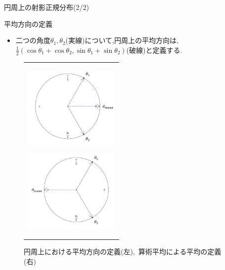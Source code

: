 \documentclass[dvipdfmx]{beamer} %
\begin{document}
\begin{frame}{円周上の射影正規分布(2/2)}

\begin{itembox}[l]{平均方向の定義}
\begin{itemize}

	\item 
	二つの角度$\theta_1, \theta_2$(実線)について,円周上の平均方向は, $\frac{1}{2} (\cos \theta_1 + \cos \theta_2,\sin \theta_1 + \sin \theta_2)$(破線)と定義する.
\end{itemize}
\end{itembox}

\vspace{-0.1cm}
\begin{figure}[H]
 \begin{tabular}{c}
 \begin{minipage}{0.5\hsize}
  \begin{center}
   \includegraphics[clip,height= 40mm]{data/sample_True_1.png}
\label{sample_mu1}
  \end{center}
 \end{minipage}
 \hspace{-0.8cm}
 \begin{minipage}{0.5\hsize}
  \begin{center}
 \includegraphics[clip,height= 40mm]{data/sample_False_1.png}
\label{sample_mu2}
  \end{center}
 \end{minipage}
\end{tabular}
\label{sample_mu}
\vspace{-0.1cm}
\caption{円周上における平均方向の定義(左),\ 算術平均による平均の定義(右)}
\end{figure}

\end{frame}
\end{document}
